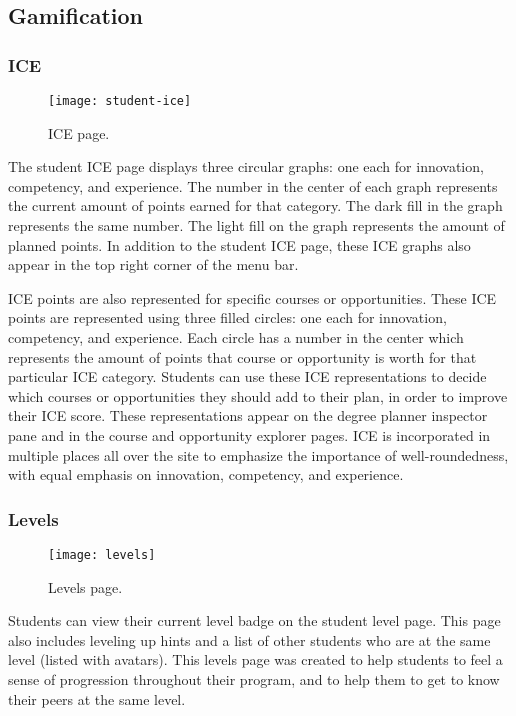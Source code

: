 \subsection{Gamification}
\subsubsection{ICE}
\begin{figure}[htbp!]
\centering
\texttt{[image: student-ice]}
\caption{ICE page.}
\end{figure}

The student ICE page displays three circular graphs: one each for innovation, competency, and experience. The number in the center of each graph represents the current amount of points earned for that category. The dark fill in the graph represents the same number. The light fill on the graph represents the amount of planned points. In addition to the student ICE page, these ICE graphs also appear in the top right corner of the menu bar. 

ICE points are also represented for specific courses or opportunities. These ICE points are represented using three filled circles: one each for innovation, competency, and experience. Each circle has a number in the center which represents the amount of points that course or opportunity is worth for that particular ICE category. Students can use these ICE representations to decide which courses or opportunities they should add to their plan, in order to improve their ICE score. These representations appear on the degree planner inspector pane and in the course and opportunity explorer pages. ICE is incorporated in multiple places all over the site to emphasize the importance of well-roundedness, with equal emphasis on innovation, competency, and experience.

\subsubsection{Levels}
\begin{figure}[htbp!]
\centering
\texttt{[image: levels]}
\caption{Levels page.}
\end{figure}

Students can view their current level badge on the student level page. This page also includes leveling up hints and a list of other students who are at the same level (listed with avatars). This levels page was created to help students to feel a sense of progression throughout their program, and to help them to get to know their peers at the same level.

